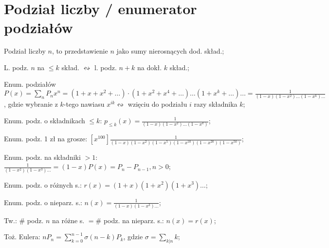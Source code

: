 \section{Podział liczby / enumerator podziałów}

Podział liczby $n$, to przedstawienie $n$ jako sumy nierosnących dod. skład.;

L. podz. $n$ na $\leq k$ skład. $\leftrightsquigarrow$
  l. podz. $n+k$ na dokł. $k$ skład.;

Enum. podziałów $P(x) = \sum_nP_nx^n =
  (1+x+x^2+\dots)\cdot(1+x^2+x^4+\dots)\dots(1+x^k+\dots)\dots =
  \frac{1}{(1-x)(1-x^2)\dots(1-x^k)\dots}$, gdzie wybranie z $k$-tego nawiasu
  $x^{ik} \leftrightsquigarrow$ wzięciu do podziału $i$ razy składnika $k$;

Enum. podz. o składnikach $\leq k$: $p_{\leq k} (x) =
  \frac{1}{(1-x)(1-x^2)\dots(1-x^k)}$;

Enum. podz. 1 zł na grosze:
  $\left [ x^{100} \right ]
  \frac{1}{(1-x)(1-x^2)(1-x^5)(1-x^{10})(1-x^{20})(1-x^{50})}$;

Enum. podz. na składniki $>1$: $\frac{1}{(1-x^2)(1-x^3)\dots}=(1-x)P(x) =
  P_n - P_{n-1}, n>0$;

Enum. podz. o różnych s.: $r(x) = (1+x)(1+x^2)(1+x^3)\dots$;

Enum. podz. o nieparz. s.: $n(x)=\frac{1}{(1-x)(1-x^3)\dots}$;

Tw.: $\#$ podz. $n$ na różne s. $= \#$ podz. na nieparz. s.: $n(x) = r(x)$;

Toż. Eulera: $nP_n = \sum_{k=0}^{n-1}\sigma(n-k)P_k$,
  gdzie $\sigma = \sum_{k|n}k$;

